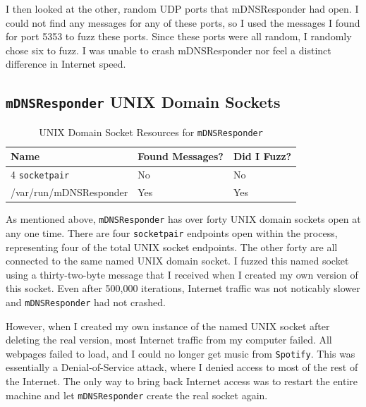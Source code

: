 I then looked at the other, random UDP ports that mDNSResponder had open.  I could not find any messages for any of these ports, so I used the messages I found for port 5353 to fuzz these ports.  Since these ports were all random, I randomly chose six to fuzz.  I was unable to crash mDNSResponder nor feel a distinct difference in Internet speed.

\subsection{\texttt{mDNSResponder} UNIX Domain Sockets}
\label{sec:mdnsUnix}

\begin{table}
\centering
\begin{normalsize}
\begin{tabular}{ l | l | l }
\textbf{Name} & \textbf{Found Messages?} & \textbf{Did I Fuzz?} \\ \hline
4 \texttt{socketpair} & No & No \\ \hline
/var/run/mDNSResponder & Yes & Yes \\ \hline
\end{tabular}
\caption{UNIX Domain Socket Resources for \texttt{mDNSResponder}}
\label{tab:mdnsUnixTab}
\end{normalsize}
\end{table} 

As mentioned above, \texttt{mDNSResponder} has over forty UNIX domain sockets open at any one time.  There are four \texttt{socketpair} endpoints open within the process, representing four of the total UNIX socket endpoints.  The other forty are all connected to the same named UNIX domain socket.  I fuzzed this named socket using a thirty-two-byte message that I received when I created my own version of this socket.  Even after 500,000 iterations, Internet traffic was not noticably slower and \texttt{mDNSResponder} had not crashed.

However, when I created my own instance of the named UNIX socket after deleting the real version, most Internet traffic from my computer failed.  All webpages failed to load, and I could no longer get music from \texttt{Spotify}.  This was essentially a Denial-of-Service attack, where I denied access to most of the rest of the Internet.  The only way to bring back Internet access was to restart the entire machine and let \texttt{mDNSResponder} create the real socket again.

